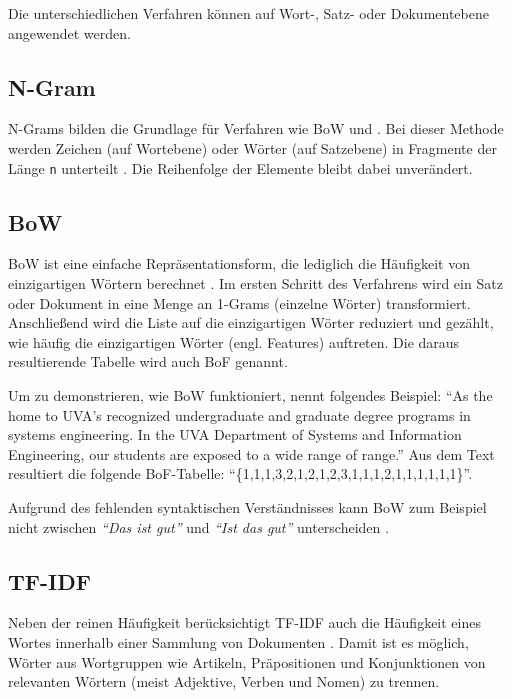 Die unterschiedlichen Verfahren können auf Wort-, Satz- oder Dokumentebene angewendet werden.

\subsection*{N-Gram}

N-Grams bilden die Grundlage für Verfahren wie \ac{BoW} und \ft. Bei dieser Methode werden Zeichen (auf Wortebene) oder Wörter (auf Satzebene) in Fragmente der Länge \texttt{n} unterteilt \autocite[5]{kowsari_text_2019}. Die Reihenfolge der Elemente bleibt dabei unverändert.

\subsection*{\acl{BoW}}

\ac{BoW} ist eine einfache Repräsentationsform, die lediglich die Häufigkeit von einzigartigen Wörtern berechnet \autocite[6]{kowsari_text_2019}. Im ersten Schritt des Verfahrens wird ein Satz oder Dokument in eine Menge an 1-Grams (einzelne Wörter) transformiert. Anschließend wird die Liste auf die einzigartigen Wörter reduziert und gezählt, wie häufig die einzigartigen Wörter (engl. Features) auftreten. Die daraus resultierende Tabelle wird auch \ac{BoF} genannt.

Um zu demonstrieren, wie \ac{BoW} funktioniert, nennt \textcite[6]{kowsari_text_2019} folgendes Beispiel: \enquote{As the home to UVA’s recognized undergraduate and graduate degree programs in systems engineering. In the UVA Department of Systems and Information Engineering, our students are exposed to a wide range of range.} Aus dem Text resultiert die folgende \ac{BoF}-Tabelle: \enquote{\{1,1,1,3,2,1,2,1,2,3,1,1,1,2,1,1,1,1,1,1\}}.

Aufgrund des fehlenden syntaktischen Verständnisses kann \ac{BoW} zum Beispiel nicht zwischen \textit{\enquote{Das ist gut}} und \textit{\enquote{Ist das gut}} unterscheiden \autocite[6]{kowsari_text_2019}.

\subsection*{\acl{TF-IDF}}

Neben der reinen Häufigkeit berücksichtigt \ac{TF-IDF} auch die Häufigkeit eines Wortes innerhalb einer Sammlung von Dokumenten \autocite[7]{kowsari_text_2019}. Damit ist es möglich, Wörter aus Wortgruppen wie Artikeln, Präpositionen und Konjunktionen von relevanten Wörtern (meist Adjektive, Verben und Nomen) zu trennen.

